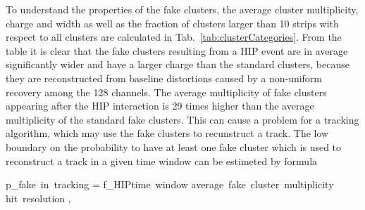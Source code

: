 \begin{table}
\begin{center}
\caption[Table caption text]{The average cluster charge, multiplicity and width and the fraction of clusters larger than 10 strips for four categories defined in Tab.~\ref{tab:eventCategories} for run 273162. The quantities are computed from both on-track and off-track clusters.}
\label{tab:clusterCategories}
\end{center}
\end{table}
To understand the properties of the fake clusters, the average cluster multiplicity, charge and width as well as the fraction of clusters larger than 10 strips with respect to all clusters are calculated in Tab.~\ref{tab:clusterCategories}. From the table it is clear that the fake clusters resulting from a HIP event are in average significantly wider and have a larger charge than the standard clusters, because they are reconstructed from baseline distortions caused by a non-uniform recovery among the 128 channels. The average multiplicity of fake clusters appearing after the HIP interaction is 29 times higher than the average multiplicity of the standard fake clusters. This can cause a problem for a tracking algorithm, which may use the fake clusters to recunstruct a track. The low boundary on the probability to have at least one fake cluster which is used to reconstruct a track in a given time window can be estimeted by formula


{
   p_{fake~in~tracking} = f_{HIP}\times time~window  \times average~fake~cluster~multiplicity \times hit~resolution ,
}


